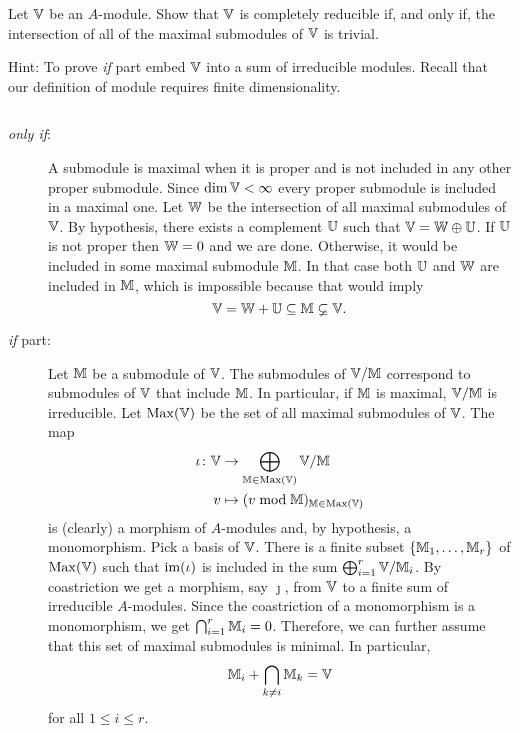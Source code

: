 \begin{probl}\label{probl:chinise-remainder}
    Let\/ $\mathbb V$ be an\/ $A$-module. Show that\/ $\mathbb V$ is completely reducible if, and only if, the intersection of all of the maximal submodules of\/ $\mathbb V$ is trivial.

    \textrm{\rm Hint: To prove \textit{if\/} part embed\/ $\mathbb V$ into a sum of irreducible modules. Recall that our definition of module requires finite dimensionality.}
\end{probl}

\begin{solution}${}$
    \begin{description}
        \item[\rm\textit{only if\/}:] A submodule is maximal when it is proper and is not included in any other proper submodule. Since $\dim\mathbb V<\infty$ every proper submodule is included in a maximal one.  Let $\mathbb W$ be the intersection of all maximal submodules of $\mathbb V$. By hypothesis, there exists a complement $\mathbb U$ such that $\mathbb V=\mathbb W\oplus\mathbb U$. If $\mathbb U$ is not proper then $\mathbb W=0$ and we are done. Otherwise, it would be included in some maximal submodule $\mathbb M$. In that case both $\mathbb U$ and $\mathbb W$ are included in $\mathbb M$, which is impossible because that would imply
        $$
            \mathbb V=\mathbb W+\mathbb U\subseteq\mathbb M\varsubsetneq\mathbb V.
        $$

        \item[\rm\textit{if\/} part:] Let $\mathbb M$ be a submodule of $\mathbb V$. The submodules of $\mathbb V/\mathbb M$ correspond to submodules of $\mathbb V$ that include $\mathbb M$. In particular, if $\mathbb M$ is maximal, $\mathbb V/\mathbb M$ is irreducible. Let $\operatorname{Max}(\mathbb V)$ be the set of all maximal submodules of $\mathbb V$. The map
        \begin{align*}
            \iota\colon\mathbb V&\to\bigoplus_{\mathbb M\in \operatorname{Max}(\mathbb V)}
                \mathbb V/\mathbb M\\
            v&\mapsto(v\bmod\mathbb M)_{\mathbb M\in
                \operatorname{Max}(\mathbb V)}
        \end{align*}
        is (clearly) a morphism of $A$-modules and, by hypothesis, a monomorphism. Pick a basis of $\mathbb V$. There is a finite subset $\{\mathbb M_1,\dots,\mathbb M_r\}$ of $\operatorname{Max}(\mathbb V)$ such that $\operatorname{im}(\iota)$ is included in the sum $\bigoplus_{i=1}^r\mathbb V/\mathbb M_i$. By coastriction we get a morphism, say $\jmath$, from $\mathbb V$ to a finite sum of irreducible $A$-modules. Since the coastriction of a monomorphism is a monomorphism, we get $\bigcap_{i=1}^r\mathbb M_i=0$. Therefore, we can further assume that this set of maximal submodules is minimal. In particular,
        \begin{equation}\label{eq:chinese-condition}
            \mathbb M_i + \bigcap_{k\ne i}\mathbb M_k=\mathbb V
        \end{equation}
        for all $1\le i\le r$.


\end{description}
\end{solution}
